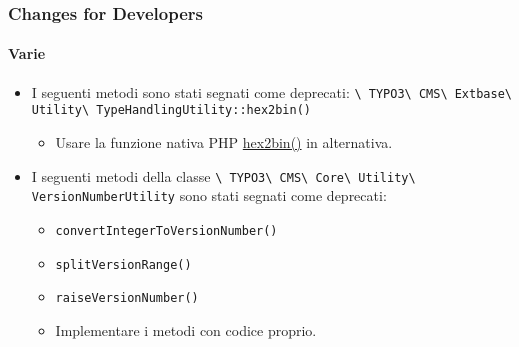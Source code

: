 \begin{frame}[fragile]
	\frametitle{Changes for Developers}
	\framesubtitle{Varie}

	\begin{itemize}

		\item I seguenti metodi sono stati segnati come deprecati:\newline
			\smaller\texttt{\textbackslash
				TYPO3\textbackslash
				CMS\textbackslash
				Extbase\textbackslash
				Utility\textbackslash
				TypeHandlingUtility::hex2bin()}\normalsize

			\begin{itemize}\smaller
				\item[\ding{228}] Usare la funzione nativa PHP \href{https://www.php.net/manual/en/function.hex2bin.php}{hex2bin()} in alternativa.
			\end{itemize}\normalsize

		\item I seguenti metodi della classe
			\smaller\texttt{\textbackslash
				TYPO3\textbackslash
				CMS\textbackslash
				Core\textbackslash
				Utility\textbackslash
				VersionNumberUtility}\normalsize\newline
			sono stati segnati come deprecati:

			\begin{itemize}
				\item \texttt{convertIntegerToVersionNumber()}
				\item \texttt{splitVersionRange()}
				\item \texttt{raiseVersionNumber()}
			\end{itemize}

			\begin{itemize}\smaller
				\item[\ding{228}] Implementare i metodi con codice proprio.
			\end{itemize}\normalsize

	\end{itemize}

\end{frame}


